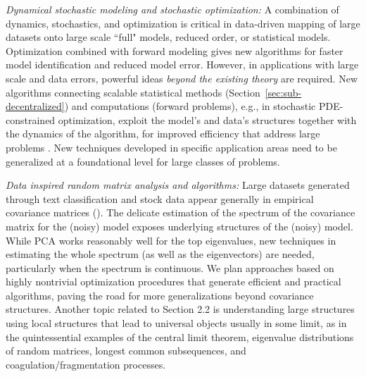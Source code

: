 \documentclass[12pt]{article}
\begin{document}
{\it Dynamical stochastic modeling and stochastic optimization:}
A combination of dynamics, stochastics, and optimization is critical in data-driven mapping of large datasets onto large scale ``full" models, reduced order, or statistical models. %
Optimization combined with forward modeling gives new algorithms for faster model identification and reduced model error.  However, in applications with large scale and data errors, powerful ideas {\it beyond the existing theory} are required.  New algorithms connecting  scalable statistical methods (Section~\ref{sec:sub-decentralized}) and computations (forward problems), e.g., in stochastic PDE-constrained optimization,  exploit the model's and data's  structures together with the dynamics of the algorithm, for improved efficiency that address large problems \cite{zhilong2016uncertainty}.  New techniques  developed in specific application areas need to be  generalized at a foundational level for large classes of problems.

{\it Data inspired random matrix analysis and algorithms:}  Large datasets generated through text classification and stock data appear generally in empirical covariance matrices (\cite{koltchinskii2015normal,koltchinskii2014asymptotics,karoui2008spectrum,marvcenko1967distribution,
bai2010spectral,ledoit2015spectrum,ledoit2011eigenvectors}).
The delicate estimation of the spectrum of the covariance matrix for the (noisy) model
exposes  underlying structures of the (noisy) model.  While PCA works reasonably well for the top eigenvalues, new techniques in estimating the whole spectrum (as well as the eigenvectors) are needed, particularly when the spectrum is continuous.   We plan approaches based on highly nontrivial optimization procedures that generate efficient and practical algorithms, paving the road for more generalizations beyond covariance structures. Another topic related to Section 2.2 is understanding large structures using local structures that lead to universal objects usually in some limit, as in the quintessential examples of the central limit theorem, eigenvalue distributions of random matrices, longest common subsequences, and coagulation/fragmentation processes.
\end{document}

